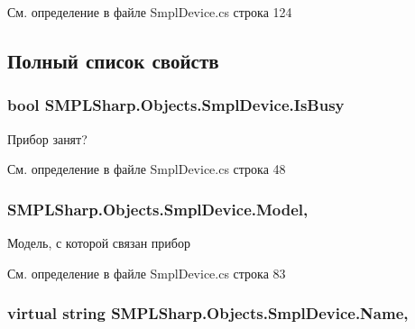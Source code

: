 См. определение в файле Smpl\-Device.\-cs строка 124



\subsection{Полный список свойств}
\hypertarget{class_s_m_p_l_sharp_1_1_objects_1_1_smpl_device_a7e6939193f240d5f5642e07ef7d6b73e}{
\subsubsection[{Is\-Busy}]{\setlength{\rightskip}{0pt plus 5cm}bool S\-M\-P\-L\-Sharp.\-Objects.\-Smpl\-Device.\-Is\-Busy\hspace{0.3cm}{\ttfamily [get]}}}\label{d7/d39/class_s_m_p_l_sharp_1_1_objects_1_1_smpl_device_a7e6939193f240d5f5642e07ef7d6b73e}


Прибор занят? 



См. определение в файле Smpl\-Device.\-cs строка 48

\hypertarget{class_s_m_p_l_sharp_1_1_objects_1_1_smpl_device_ad4036c2596ab7029b778ad45090df69b}{
\subsubsection[{Model}]{ S\-M\-P\-L\-Sharp.\-Objects.\-Smpl\-Device.\-Model\hspace{0.3cm}{\ttfamily [get]}, {\ttfamily [set]}}}\label{d7/d39/class_s_m_p_l_sharp_1_1_objects_1_1_smpl_device_ad4036c2596ab7029b778ad45090df69b}


Модель, с которой связан прибор 



См. определение в файле Smpl\-Device.\-cs строка 83

\hypertarget{class_s_m_p_l_sharp_1_1_objects_1_1_smpl_device_a3525605581b83649d988ca1326b4732f}{
\subsubsection[{Name}]{\setlength{\rightskip}{0pt plus 5cm}virtual string S\-M\-P\-L\-Sharp.\-Objects.\-Smpl\-Device.\-Name\hspace{0.3cm}{\ttfamily [get]}, {\ttfamily [set]}}}\label{d7/d39/class_s_m_p_l_sharp_1_1_objects_1_1_smpl_device_a3525605581b83649d988ca1326b4732f}


